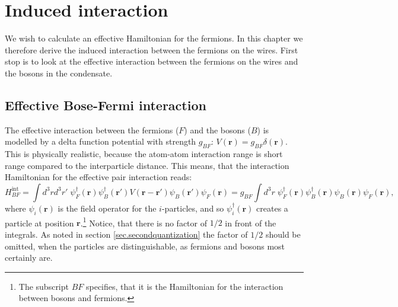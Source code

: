 
\chapter{Induced interaction} %

\label{Chapter3} %


We wish to calculate an effective Hamiltonian for the fermions. In this chapter we therefore derive the induced interaction between the fermions on the wires. First stop is to look at the effective interaction between the fermions on the wires and the bosons in the condensate.

\section{Effective Bose-Fermi interaction}
The effective interaction between the fermions ($F$) and the bosons ($B$) is modelled by a delta function potential with strength $g_{BF}$: $V(\mathbf{r})=g_{BF}\delta(\mathbf{r})$. This is physically realistic, because the atom-atom interaction range is short range compared to the interparticle distance. This means, that the interaction Hamiltonian for the effective pair interaction reads:
\begin{equation}
H_{BF}^\text{int}  = \int d^3 r d^3 r' \; \psi_F^\dagger(\mathbf{r}) \psi_B^\dagger(\mathbf{r}')V(\mathbf{r}-\mathbf{r}')\psi_B(\mathbf{r}')\psi_F(\mathbf{r}) = g_{BF}\int d^3 r \; \psi_F^\dagger(\mathbf{r}) \psi_B^\dagger(\mathbf{r})\psi_B(\mathbf{r})\psi_F(\mathbf{r}),
\label{eq.HintBF}
\end{equation}
where $\psi_i(\mathbf{r})$ is the field operator for the $i$-particles, and so $\psi_i^\dagger(\mathbf{r})$ creates a particle at position $\mathbf{r}$.\footnote{The subscript $BF$ specifies, that it is the Hamiltonian for the interaction between bosons and fermions.} Notice, that there is no factor of $1/2$ in front of the integrals. As noted in section \ref{sec.secondquantization} the factor of $1/2$ should be omitted, when the particles are distinguishable, as fermions and bosons most certainly are. 

